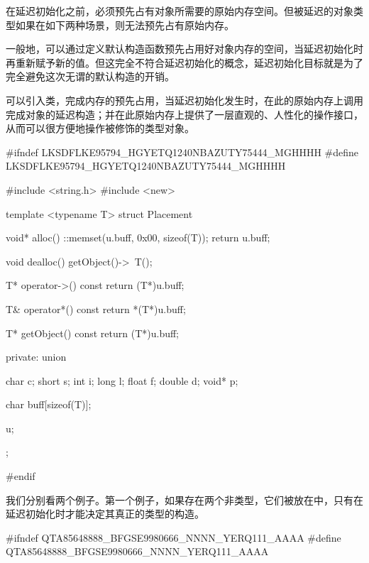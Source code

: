 \begin{content}
在延迟初始化之前，必须预先占有对象所需要的原始内存空间。但被延迟的对象类型如果在如下两种场景，则无法预先占有原始内存。

\begin{enum}
\end{enum}

一般地，可以通过定义默认构造函数预先占用好对象内存的空间，当延迟初始化时再重新赋予新的值。但这完全不符合延迟初始化的概念，延迟初始化目标就是为了完全避免这次无谓的默认构造的开销。

可以引入类，完成内存的预先占用，当延迟初始化发生时，在此的原始内存上调用完成对象的延迟构造；并在此原始内存上提供了一层直观的、人性化的操作接口，从而可以很方便地操作被修饰的类型对象。

\begin{leftbar}
\begin{c++}[caption={\ttfamily{cub/base/Placement.h}}]
#ifndef LKSDFLKE95794_HGYETQ1240NBAZUTY75444_MGHHHH
#define LKSDFLKE95794_HGYETQ1240NBAZUTY75444_MGHHHH

#include <string.h>
#include <new>

template <typename T>
struct Placement
{
    void* alloc()
    {
        ::memset(u.buff, 0x00, sizeof(T));
        return u.buff;
    }

    void dealloc()
    {
        getObject()->~T();
    }    

    T* operator->() const
    {
        return (T*)u.buff;
    }

    T& operator*() const
    {
        return *(T*)u.buff;
    }

    T* getObject() const
    {
        return (T*)u.buff;
    }

private:
    union
    {
        char   c;
        short  s;
        int    i;
        long   l;
        float  f;
        double d;
        void*  p;

        char buff[sizeof(T)];
    }u;
};

#endif
\end{c++}
\end{leftbar}

我们分别看两个例子。第一个例子，如果存在两个非类型，它们被放在中，只有在延迟初始化时才能决定其真正的类型的构造。

\begin{leftbar}
\begin{c++}[caption={\ttfamily{money/AccountFactory.h}}]
#ifndef QTA85648888_BFGSE9980666_NNNN_YERQ111_AAAA
#define QTA85648888_BFGSE9980666_NNNN_YERQ111_AAAA


\end{c++}
\end{leftbar}
\end{content}

